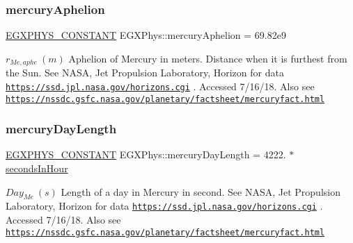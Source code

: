 \subsubsection{\texorpdfstring{mercury\+Aphelion}{mercuryAphelion}}
{\footnotesize\ttfamily \mbox{\hyperlink{group___e_g_x_phys-_constants-_macros_ga76980d288494ce1714c9ac68a95ba702}{E\+G\+X\+P\+H\+Y\+S\+\_\+\+C\+O\+N\+S\+T\+A\+NT}} E\+G\+X\+Phys\+::mercury\+Aphelion = 69.\+82e9}

$ r_{Me,aphe} \ (m)$ Aphelion of Mercury in meters. Distance when it is furthest from the Sun. See N\+A\+SA, Jet Propulsion Laboratory, Horizon for data \href{https://ssd.jpl.nasa.gov/horizons.cgi}{\tt https\+://ssd.\+jpl.\+nasa.\+gov/horizons.\+cgi} . Accessed 7/16/18. Also see \href{https://nssdc.gsfc.nasa.gov/planetary/factsheet/mercuryfact.html}{\tt https\+://nssdc.\+gsfc.\+nasa.\+gov/planetary/factsheet/mercuryfact.\+html} \mbox{\label{group___e_g_x_phys-_constants-_astrophysics-_solar_system-_mercury-_orbit_ga76e5523953ddab271845bbaf597fc16c}} 
\subsubsection{\texorpdfstring{mercury\+Day\+Length}{mercuryDayLength}}
{\footnotesize\ttfamily \mbox{\hyperlink{group___e_g_x_phys-_constants-_macros_ga76980d288494ce1714c9ac68a95ba702}{E\+G\+X\+P\+H\+Y\+S\+\_\+\+C\+O\+N\+S\+T\+A\+NT}} E\+G\+X\+Phys\+::mercury\+Day\+Length = 4222. $\ast$ \mbox{\hyperlink{namespace_e_g_x_phys_a7c3165cd93e36f1fb8e9fef80f117bef}{seconds\+In\+Hour}}}

$ Day_{Me} \ (s)$ Length of a day in Mercury in second. See N\+A\+SA, Jet Propulsion Laboratory, Horizon for data \href{https://ssd.jpl.nasa.gov/horizons.cgi}{\tt https\+://ssd.\+jpl.\+nasa.\+gov/horizons.\+cgi} . Accessed 7/16/18. Also see \href{https://nssdc.gsfc.nasa.gov/planetary/factsheet/mercuryfact.html}{\tt https\+://nssdc.\+gsfc.\+nasa.\+gov/planetary/factsheet/mercuryfact.\+html} \mbox{\label{group___e_g_x_phys-_constants-_astrophysics-_solar_system-_mercury-_orbit_ga691d47f9e6155fde39610f722c2c81b3}} 
